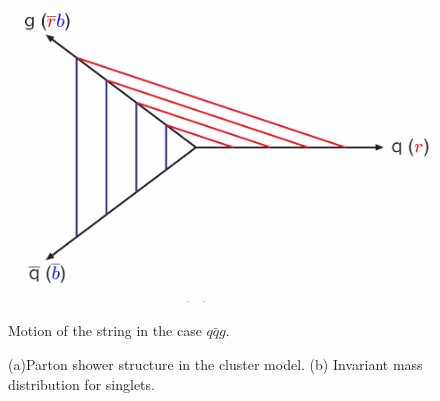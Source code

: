 \begin{figure}
\centering%
{\includegraphics[scale= 0.5]{../Cap3/Fig_MC/stringtwo22}}
\caption{Motion of the string in the case $q \bar{q}g$.}
\label{tubo3}
\end{figure}

\begin{figure}
\centering%
\caption{(a)Parton shower structure in the cluster model. (b) Invariant mass distribution for singlets.}
\label{tubo2}
\end{figure}


